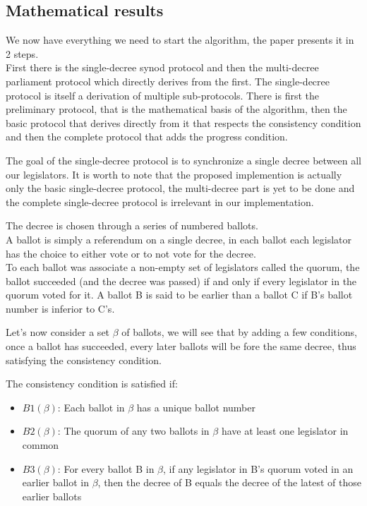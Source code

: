 \documentclass{article}
\begin{document}
\subsection{Mathematical results}
We now have everything we need to start the algorithm, the paper presents it in 2 steps.\\
First there is the single-decree synod protocol and then the multi-decree parliament protocol which directly derives from the first.
The single-decree protocol is itself a derivation of multiple sub-protocols. There is first the preliminary protocol, that is the mathematical basis of the algorithm, then the basic protocol that derives directly from it that respects the consistency condition and then the complete protocol that adds the progress condition.

The goal of the single-decree protocol is to synchronize a single decree between all our legislators. It is worth to note that the proposed implemention is actually only the basic single-decree protocol, the multi-decree part is yet to be done and the complete single-decree protocol is irrelevant in our implementation.


The decree is chosen through a series of numbered ballots.\\
A ballot is simply a referendum on a single decree, in each ballot each legislator has the choice to either vote or to not vote for the decree.\\
To each ballot was associate a non-empty set of legislators called the quorum, the ballot succeeded (and the decree was passed) if and only if every legislator in the quorum voted for it.
A ballot B is said to be earlier than a ballot C if B's ballot number is inferior to C's.

Let's now consider a set ${\beta}$ of ballots, we will see that by adding a few conditions, once a ballot has succeeded, every later ballots will be fore the same decree, thus satisfying the consistency condition.

The consistency condition is satisfied if:
\begin{itemize}
    \item $B1(\beta)$: Each ballot in $\beta$ has a unique ballot number
    \item $B2(\beta)$: The quorum of any two ballots in $\beta$ have at least one legislator in common
    \item $B3(\beta)$: For every ballot B in $\beta$, if any legislator in B's quorum voted in an earlier ballot in $\beta$, then the decree of B equals the decree of the latest of those earlier ballots
\end{itemize}
\end{document}
